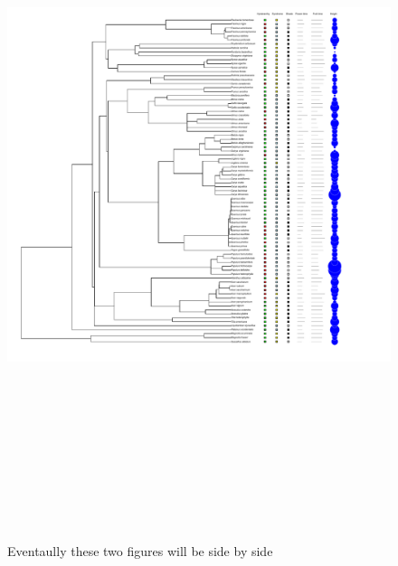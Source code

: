 \documentclass{article}\usepackage[]{graphicx}\usepackage[]{color}
\begin{document}
\begin{itemize}
\begin{figure}[h!]
\includegraphics[width=20cm, height=20cm]{../figure/silvics_phylo_alltraits.pdf}\\
\caption{Eventaully these two figures will be side by side}
\end{figure}



\end{itemize}
\end{document}
